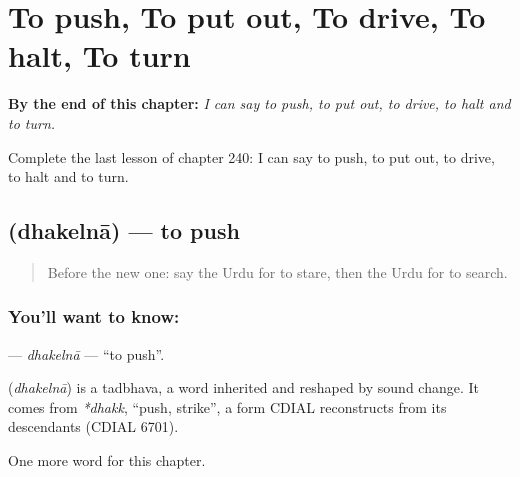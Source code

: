 
\chapter{To push, To put out, To drive, To halt, To turn}
\label{ch:ur-to-push-to-put-out-to-drive-to-halt-to-turn}

\begin{chapteropening}
\textbf{By the end of this chapter:} \emph{I can say to push, to put out, to drive, to halt and to turn.}

Complete the last lesson of chapter 240: I can say to push, to put out, to drive, to halt and to turn.
\end{chapteropening}

\section[\texorpdfstring{\ur{دھکیلنا} (dhakelnā)}{دھکیلنا (dhakelnā)}]{ (dhakelnā) — to push}

\label{lesson:UR-C240-dhakelna}



\begin{quote}
Before the new one: say the Urdu for to stare, then the Urdu for to search.
\end{quote}

\subsection*{You'll want to know: }
\textbf{} — \emph{dhakelnā} — \textquotedblleft{}to push\textquotedblright{}.

\begin{cousinweb}
\textbf{} (\emph{dhakelnā}) is a tadbhava, a word inherited and reshaped by sound change. It comes from \emph{*dhakk}, \textquotedblleft{}push, strike\textquotedblright{}, a form CDIAL reconstructs from its descendants (CDIAL 6701).
\end{cousinweb}

\begin{grammarlens}[title={What you've built}]
One more word for this chapter.
\end{grammarlens}

